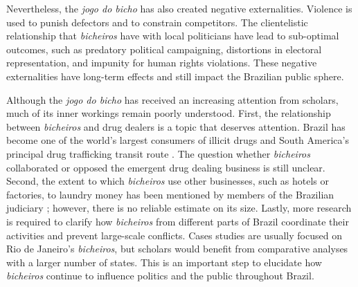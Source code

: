 \documentclass[a4paper,12pt]{article}
\begin{document}
Nevertheless, the \textit{jogo do bicho} has also created negative externalities. Violence is used to punish defectors and to constrain competitors. The clientelistic relationship that \textit{bicheiros} have with local politicians have lead to sub-optimal outcomes, such as predatory political campaigning, distortions in electoral representation, and impunity for human rights violations. These negative externalities have long-term effects and still impact the Brazilian public sphere.

Although the \textit{jogo do bicho} has received an increasing attention from scholars, much of its inner workings remain poorly understood. First, the relationship between \textit{bicheiros} and drug dealers is a topic that deserves attention. Brazil has become one of the world's largest consumers of illicit drugs and South America's principal drug trafficking transit route \citep{miraglia2015drugs,misse2011crime}. The question whether \textit{bicheiros} collaborated or opposed the emergent drug dealing business is still unclear. Second, the extent to which \textit{bicheiros} use other businesses, such as hotels or factories, to laundry money has been mentioned by members of the Brazilian judiciary \citep{globo2012bicheiro,globo2015cacaniquel}; however, there is no reliable estimate on its size. Lastly, more research is required to clarify how \textit{bicheiros} from different parts of Brazil coordinate their activities and prevent large-scale conflicts. Cases studies are usually focused on Rio de Janeiro's \textit{bicheiros}, but scholars would benefit from comparative analyses with a larger number of states. This is an important step to elucidate how \textit{bicheiros} continue to influence politics and the public throughout Brazil.

\newpage


\end{document}

